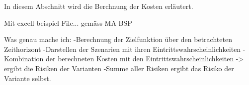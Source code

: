 %
%
%
%

\label{subsec:Kosten}

In diesem Abschnitt wird die Berchnung der Kosten erläutert.

Mit excell beispiel File... gemäss MA BSP

Was genau mache ich:
-Berechnung der Zielfunktion über den betrachteten Zeithorizont
-Darstellen der Szenarien mit ihren Eintrittswahrscheinlichkeiten
-Kombination der berechneten Kosten mit den Eintrittswahrscheinlichkeiten -> ergibt die Risiken der Varianten
-Summe aller Risiken ergibt das Risiko der Variante selbst.

%

